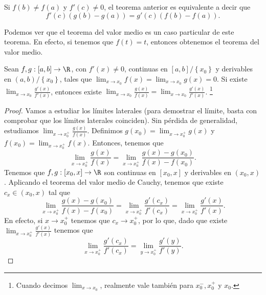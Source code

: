 \begin{observation}
\normalfont Si $\displaystyle f\left(b\right) \neq f\left(a\right) $ y $\displaystyle f'\left(c\right) \neq 0 $, el teorema anterior es equivalente a decir que
\[ f'\left(c\right)\left(g\left(b\right)-g\left(a\right)\right) = g'\left(c\right)\left(f\left(b\right)-f\left(a\right)\right) .\]
\end{observation}
\begin{observation}
\normalfont Podemos ver que el teorema del valor medio es un caso particular de este teorema. En efecto, si tenemos que $\displaystyle f\left(t\right) = t $, entonces obtenemos el teorema del valor medio.
\end{observation}
\begin{ftheorem}
	\normalfont Sean $\displaystyle f,g : \left[a,b\right] \to \R $, con $\displaystyle f'\left(x\right) \neq 0 $, continuas en $\displaystyle \left[a,b\right] / \left\{ x_{0}\right\}  $ y derivables en $\displaystyle \left(a,b\right) / \left\{ x_{0}\right\}  $, tales que $\displaystyle \lim_{x \to x_{0}}f\left(x\right) = \lim_{x \to x_{0}}g\left(x\right) = 0 $. Si existe $\displaystyle \lim_{x \to x_{0}} \frac{g'\left(x\right)}{f'\left(x\right)} $, entonces existe $\displaystyle \lim_{x \to x_{0}}\frac{g\left(x\right)}{f\left(x\right)} = \lim_{x \to x_{0}}\frac{g'\left(x\right)}{f'\left(x\right)} $. 
	\footnote{Cuando decimos $\displaystyle \lim_{x \to x_{0}} $, realmente vale también para $\displaystyle x_{0}^{-}, x_{0}^{+} $ y $\displaystyle x_{0} $.} 
\end{ftheorem}
\begin{proof}
Vamos a estudiar los límites laterales (para demostrar el límite, basta con comprobar que los límites laterales coinciden). Sin pérdida de generalidad, estudiamos $\displaystyle \lim_{x \to x_{0}^{+}}\frac{g\left(x\right)}{f\left(x\right)} $. Definimos $\displaystyle g\left(x_{0}\right) = \lim_{x \to x_{0}^{+}}g\left(x\right) $ y $\displaystyle f\left(x_{0}\right) = \lim_{x \to x_{0}^{+}}f\left(x\right) $. Entonces, tenemos que 
\[ \lim_{x \to x_{0}^{+}}\frac{g\left(x\right)}{f\left(x\right)} = \lim_{x \to x_{0}^{+}}\frac{g\left(x\right)-g\left(x_{0}\right)}{f\left(x\right)-f\left(x_{0}\right)} .\]
Tenemos que $\displaystyle f,g : \left[x_{0}, x\right] \to \R $ son continuas en $\displaystyle \left[x_{0}, x\right]  $ y derivables en $\displaystyle \left(x_{0}, x\right) $. Aplicando el teorema del valor medio de Cauchy, tenemos que existe $\displaystyle c_{x} \in \left(x_{0}, x\right) $ tal que
\[ \lim_{x \to x_{0}^{+}}\frac{g\left(x\right)-g\left(x_{0}\right)}{f\left(x\right)-f\left(x_{0}\right)} = \lim_{x \to x_{0}^{+}}\frac{g'\left(c_{x}\right)}{f'\left(c_{x}\right)} = \lim_{x \to x_{0}^{+}}\frac{g'\left(x\right)}{f'\left(x\right)} .\]
En efecto, si $\displaystyle x \to x_{0}^{+} $ tenemos que $\displaystyle c_{x} \to x_{0}^{+} $, por lo que, dado que existe $\displaystyle \lim_{x \to x_{0}^{+}}\frac{g'\left(x\right)}{f'\left(x\right)} $ tenemos que
\[\lim_{x \to x_{0}^{+}}\frac{g'\left(c_{x}\right)}{f'\left(c_{x}\right)} = \lim_{y \to x_{0}^{+}}\frac{g'\left(y\right)}{f'\left(y\right)} .\]
\end{proof}
